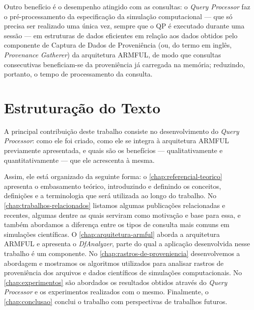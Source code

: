 Outro benefício é o desempenho atingido com as consultas: o \textit{Query Processor} faz o pré-processamento da especificação da simulação computacional --- que só precisa ser realizado uma única vez, sempre que o QP é executado durante uma sessão --- em estruturas de dados eficientes em relação aos dados obtidos pelo componente de Captura de Dados de Proveniência (ou, do termo em inglês, \textit{Provenance Gatherer}) da arquitetura ARMFUL, de modo que consultas consecutivas beneficiam-se da proveniência já carregada na memória; reduzindo, portanto, o tempo de processamento da consulta.

\section{Estruturação do Texto}

A principal contribuição deste trabalho consiste no desenvolvimento do \textit{Query Processor}: como ele foi criado, como ele se integra à arquitetura ARMFUL previamente apresentada, e quais são os benefícios --- qualitativamente e quantitativamente --- que ele acrescenta à mesma.

Assim, ele está organizado da seguinte forma:
o \autoref{chap:referencial-teorico} apresenta o embasamento teórico, introduzindo e definindo os conceitos, definições e a terminologia que será utilizada ao longo do trabalho.
No \autoref{chap:trabalhos-relacionados} listamos algumas publicações relacionadas e recentes, algumas dentre as quais serviram como motivação e base para essa, e também abordamos a diferença entre os tipos de consulta mais comuns em simulações científicas.
O \autoref{chap:arquitetura-armful} aborda a arquitetura ARMFUL e apresenta o \textit{DfAnalyzer}, parte do qual a aplicação desenvolvida nesse trabalho é um componente.
No \autoref{chap:rastros-de-proveniencia} desenvolvemos a abordagem e mostramos os algoritmos utilizados para analisar rastros de proveniência dos arquivos e dados científicos de simulações computacionais.
No \autoref{chap:experimentos} são abordados os resultados obtidos através do \textit{Query Processor} e os experimentos realizados com o mesmo.
Finalmente, o \autoref{chap:conclusao} conclui o trabalho com perspectivas de trabalhos futuros.
